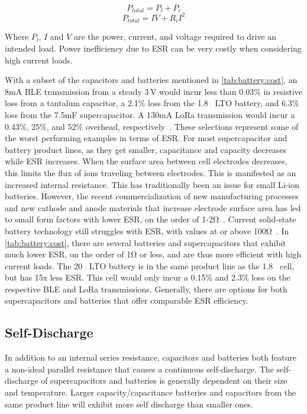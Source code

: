 $$P_{total} = P_{l} + P_{i}$$
$$P_{total} =  I V + R_{i} I^2$$

\noindent Where $P_l$, $I$ and $V$ are the power, current, and voltage required to drive an intended load. Power inefficiency due to ESR can be very costly when considering high current loads.

With a subset of the capacitors and batteries mentioned in \cref{tab:battery:cost}, an 8\si{\milli\ampere} BLE
transmission from a steady 3\,V would incur less
than 0.03\% in resistive loss from a tantalum capacitor, a 2.1\% loss from the 1.8\si{\milli\Ah} LTO battery, and 6.3\% loss from the 7.5\si{\milli\farad} supercapacitor. A 130\si{\milli\ampere} LoRa transmission would incur a 0.43\%, 25\%, and 52\% overhead, respectively~\cite{ghena2019challenge}. These selections represent some of the worst performing examples in terms of ESR. 
For most supercapacitor and battery product lines, as they get smaller, capacitance and capacity decreases while ESR increases. When the surface area between cell electrodes decreases, this limits the flux of ions traveling between electrodes. This is manifested as an increased internal resistance.
This has traditionally been an issue for small Li-ion batteries. However, the recent commercialization of new manufacturing processes and new cathode and anode materials that increase electrode surface area has led to small form factors with lower ESR, on the order of 1-2\si{\ohm}~\cite{millibatNimbus}. Current solid-state battery technology still struggles with ESR, with values at or above 100\si{\ohm}~\cite{stEnfilm,tdkCeraCharge}.
In \cref{tab:battery:cost}, there are several batteries and supercapacitors that exhibit much lower ESR, on the order of 1\si{\ohm} or less, and are thus more efficient with high current loads. 
The 20\si{\milli\Ah} LTO battery is in the same product line as the 1.8\si{\milli\Ah} cell, but has 15x less ESR. This cell would only incur a 0.15\% and 2.3\% loss on the respective BLE and LoRa transmissions.
Generally, there are options for both supercapacitors and batteries that offer comparable ESR efficiency. %


\subsection{Self-Discharge}
In addition to an internal series resistance, capacitors and batteries both feature a non-ideal parallel resistance that causes a continuous self-discharge.
The self-discharge of supercapacitors and batteries is generally dependent on their size and temperature. Larger capacity/capacitance batteries and capacitors from the same product line will exhibit more self discharge than smaller ones. 

